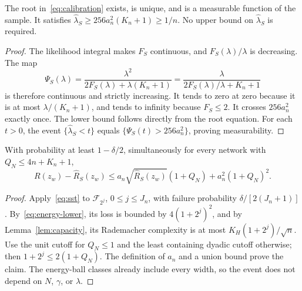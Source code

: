 \begin{lemma}
\label{lem:root}
The root in~\eqref{eq:calibration} exists, is unique, and is a measurable function of the sample. It satisfies
$\widehat\lambda_S\ge256a_n^2(K_n+1)\ge1/n$.
No upper bound on $\widehat\lambda_S$ is required.
\end{lemma}
\begin{proof}
The likelihood integral makes $F_S$ continuous, and $F_S(\lambda)/\lambda$ is decreasing. The map
\[
 \Psi_S(\lambda)=\frac{\lambda^2}{2F_S(\lambda)+\lambda(K_n+1)}
 =\frac{\lambda}{2F_S(\lambda)/\lambda+K_n+1}
\]
is therefore continuous and strictly increasing. It tends to zero at zero because it is at most $\lambda/(K_n+1)$, and tends to infinity because $F_S\le2$. It crosses $256a_n^2$ exactly once. The lower bound follows directly from the root equation. For each $t>0$, the event $\{\widehat\lambda_S<t\}$ equals $\{\Psi_S(t)>256a_n^2\}$, proving measurability.
\end{proof}

\begin{lemma}
\label{lem:stat-event}
With probability at least $1-\delta/2$, simultaneously for every network with $Q_N\le4n+K_n+1$,
\begin{equation}
 R(z_w)-\widehat R_S(z_w)
 \le a_n\sqrt{\widehat R_S(z_w)}(1+Q_N)+a_n^2(1+Q_N)^2.
 \label{eq:stat-event}
\end{equation}
\end{lemma}
\begin{proof}
Apply~\eqref{eq:sst} to $\mathcal F_{2^j}$, $0\le j\le J_n$, with failure probability $\delta/[2(J_n+1)]$. By~\eqref{eq:energy-lower}, its loss is bounded by $4(1+2^j)^2$, and by Lemma~\ref{lem:capacity}, its Rademacher complexity is at most $K_H(1+2^j)/\sqrt n$. Use the unit cutoff for $Q_N\le1$ and the least containing dyadic cutoff otherwise; then $1+2^j\le2(1+Q_N)$. The definition of $a_n$ and a union bound prove the claim. The energy-ball classes already include every width, so the event does not depend on $N$, $\gamma$, or $\lambda$.
\end{proof}

